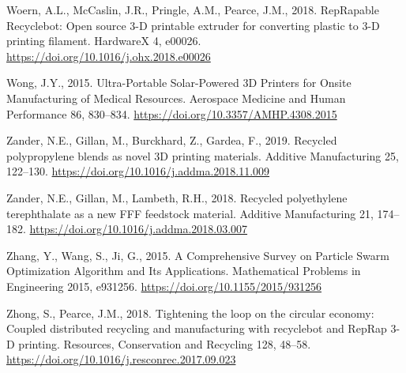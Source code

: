 \documentclass[
  12pt,
]{article}
\newlength{\cslhangindent}
\newlength{\cslentryspacingunit} %
\newenvironment{CSLReferences}[2] %
 {%
  \setlength{\parindent}{0pt}
  \ifodd #1
  \let\oldpar\par
  \def\par{\hangindent=\cslhangindent\oldpar}
  \fi
  \setlength{\parskip}{#2\cslentryspacingunit}
 }%
 {}
\begin{document}
\begin{CSLReferences}{1}{0}
\leavevmode{}%
Woern, A.L., McCaslin, J.R., Pringle, A.M., Pearce, J.M., 2018.
{RepRapable Recyclebot}: {Open} source 3-{D} printable extruder for
converting plastic to 3-{D} printing filament. HardwareX 4, e00026.
\url{https://doi.org/10.1016/j.ohx.2018.e00026}

\leavevmode{}%
Wong, J.Y., 2015. Ultra-{Portable Solar-Powered 3D Printers} for {Onsite
Manufacturing} of {Medical Resources}. Aerospace Medicine and Human
Performance 86, 830--834. \url{https://doi.org/10.3357/AMHP.4308.2015}

\leavevmode{}%
Zander, N.E., Gillan, M., Burckhard, Z., Gardea, F., 2019. Recycled
polypropylene blends as novel {3D} printing materials. Additive
Manufacturing 25, 122--130.
\url{https://doi.org/10.1016/j.addma.2018.11.009}

\leavevmode{}%
Zander, N.E., Gillan, M., Lambeth, R.H., 2018. Recycled polyethylene
terephthalate as a new {FFF} feedstock material. Additive Manufacturing
21, 174--182. \url{https://doi.org/10.1016/j.addma.2018.03.007}

\leavevmode{}%
Zhang, Y., Wang, S., Ji, G., 2015. A {Comprehensive Survey} on {Particle
Swarm Optimization Algorithm} and {Its Applications}. Mathematical
Problems in Engineering 2015, e931256.
\url{https://doi.org/10.1155/2015/931256}

\leavevmode{}%
Zhong, S., Pearce, J.M., 2018. Tightening the loop on the circular
economy: {Coupled} distributed recycling and manufacturing with
recyclebot and {RepRap} 3-{D} printing. Resources, Conservation and
Recycling 128, 48--58.
\url{https://doi.org/10.1016/j.resconrec.2017.09.023}

\end{CSLReferences}
\end{document}
